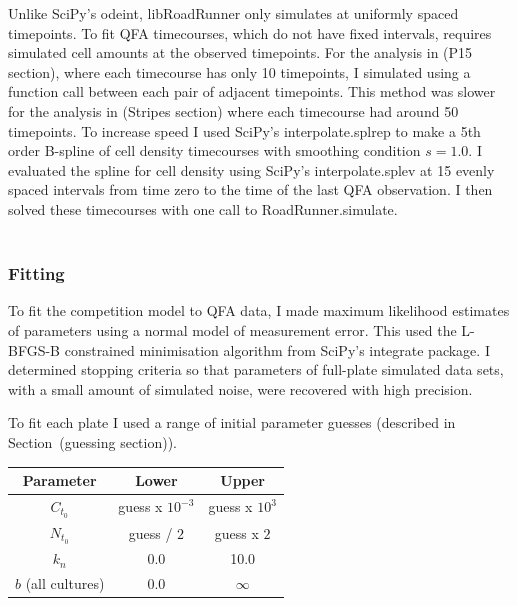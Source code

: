 
Unlike SciPy's odeint, libRoadRunner only simulates at uniformly
spaced timepoints. To fit QFA timecourses, which do not have fixed
intervals, requires simulated cell amounts at the observed
timepoints. For the analysis in (P15 section), where each timecourse
has only 10 timepoints, I simulated using a function call between each
pair of adjacent timepoints. This method was slower for the analysis
in (Stripes section) where each timecourse had around 50
timepoints. To increase speed I used SciPy's interpolate.splrep to
make a 5th order B-spline of cell density timecourses with smoothing
condition \(s=1.0\). I evaluated the spline for cell density using
SciPy's interpolate.splev at 15 evenly spaced intervals from time zero
to the time of the last QFA observation. I then solved these
timecourses with one call to RoadRunner.simulate.\\\\

\subsubsection{Fitting}

To fit the competition model to QFA data, I made maximum likelihood
estimates of parameters using a normal model of measurement
error. This used the L-BFGS-B constrained minimisation algorithm
from SciPy's integrate package. I determined stopping criteria so that
parameters of full-plate simulated data sets, with a small amount of
simulated noise, were recovered with high precision.

To fit each plate I used a range of initial parameter guesses
(described in Section~(guessing section)).

\columnbreak
\begin{center}
  \begin{tabular}{| c | c c |}
    \hline
    Parameter        & Lower   & Upper \\
    \hline
    \(C_{t_{0}}\)     & guess x \(10^{-3}\)  & guess x \(10^{3}\)\\
    \(N_{t_{0}}\)     & guess / \(2\)  & guess x \(2\)\\
    \(k_{n}\)        & 0.0    & 10.0\\
    \(b\) (all cultures)           & 0.0    & \(\infty\) \\
    \hline
  \end{tabular}
  \label{tab:p15_bounds}
\end{center}

